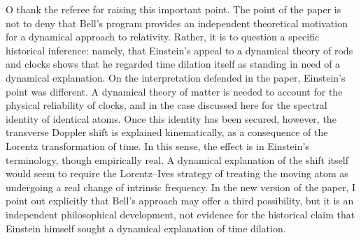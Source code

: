 \documentclass[submitted,11pt]{article}
\begin{document}
\begin{reply}
O thank the referee for raising this important point. The point of the paper is not to deny that Bell’s program provides an independent theoretical motivation for a dynamical approach to relativity. Rather, it is to question a specific historical inference: namely, that Einstein’s appeal to a dynamical theory of rods and clocks shows that he regarded time dilation itself as standing in need of a dynamical explanation. On the interpretation defended in the paper, Einstein’s point was different. A dynamical theory of matter is needed to account for the physical reliability of clocks, and in the case discussed here for the spectral identity of identical atoms. Once this identity has been secured, however, the transverse Doppler shift is explained kinematically, as a consequence of the Lorentz transformation of time. In this sense, the effect is  in Einstein’s terminology, though empirically real. A dynamical explanation of the shift itself would seem to require the Lorentz--Ives strategy of treating the moving atom as undergoing a real change of intrinsic frequency. In the new version of the paper, I point out explicitly that Bell’s approach may offer a third possibility, but it is an independent philosophical development, not evidence for the historical claim that Einstein himself sought a dynamical explanation of time dilation.


\end{reply}
\end{document}
